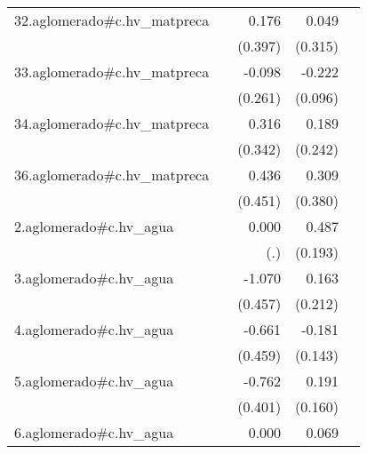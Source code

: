 {\begin{longtable}{l*{4}{D{.}{.}{-1}}}
\addlinespace
32.aglomerado#c.hv\_matpreca&                     &       0.176         &       0.049         &                     \\
            &                     &     (0.397)         &     (0.315)         &                     \\
\addlinespace
33.aglomerado#c.hv\_matpreca&                     &      -0.098         &      -0.222\sym{*}  &                     \\
            &                     &     (0.261)         &     (0.096)         &                     \\
\addlinespace
34.aglomerado#c.hv\_matpreca&                     &       0.316         &       0.189         &                     \\
            &                     &     (0.342)         &     (0.242)         &                     \\
\addlinespace
36.aglomerado#c.hv\_matpreca&                     &       0.436         &       0.309         &                     \\
            &                     &     (0.451)         &     (0.380)         &                     \\
\addlinespace
2.aglomerado#c.hv\_agua&                     &       0.000         &       0.487\sym{*}  &                     \\
            &                     &         (.)         &     (0.193)         &                     \\
\addlinespace
3.aglomerado#c.hv\_agua&                     &      -1.070\sym{*}  &       0.163         &                     \\
            &                     &     (0.457)         &     (0.212)         &                     \\
\addlinespace
4.aglomerado#c.hv\_agua&                     &      -0.661         &      -0.181         &                     \\
            &                     &     (0.459)         &     (0.143)         &                     \\
\addlinespace
5.aglomerado#c.hv\_agua&                     &      -0.762         &       0.191         &                     \\
            &                     &     (0.401)         &     (0.160)         &                     \\
\addlinespace
6.aglomerado#c.hv\_agua&                     &       0.000         &       0.069         &                     \\

\end{longtable}}
